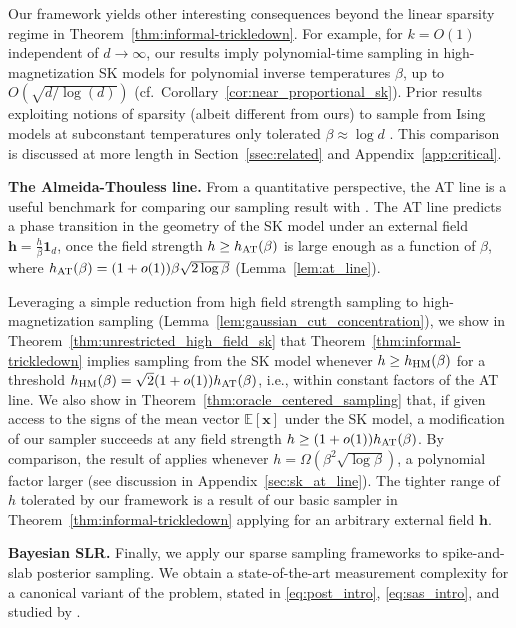 \documentclass[11pt]{article}
\newcommand{\1}{\mathbf{1}}
\newcommand{\0}{\mathbf{0}}
\newcommand{\E}{\mathbb{E}}
\newcommand{\bk}{\color{black}}
\newcommand{\vh}{{\mathbf{h}}}
\newcommand{\vx}{{\mathbf{x}}}
\newcommand{\AT}{_{\rm AT}}
\begin{document}
Our framework yields other interesting consequences beyond the linear sparsity regime in Theorem~\ref{thm:informal-trickledown}. For example, for $k = O(1)$ independent of $d \to \infty$, our results imply polynomial-time sampling in high-magnetization SK models for polynomial inverse temperatures $\beta$, up to $O(\sqrt{d/\log(d)})$ (cf.\ Corollary~\ref{cor:near_proportional_sk}). Prior results exploiting notions of sparsity (albeit different from ours) to sample from Ising models at subconstant temperatures only tolerated $\beta \approx \log d$ \cite{Carlson2022, KuchukovaPappikPerkinsYap2025}. This comparison is discussed at more length in Section~\ref{ssec:related} and Appendix~\ref{app:critical}.

\textbf{The Almeida-Thouless line.} From a quantitative perspective, the AT line is a useful benchmark for comparing our sampling result with \cite{BandeiraElAlaouiRodder26}. The AT line predicts a phase transition in the geometry of the SK model under an external field $\vh = \frac h \beta \1_d$, once the field strength $h \ge h\AT(\beta)$ is large enough as a function of $\beta$, where $h\AT(\beta) = (1 + o(1))\beta\sqrt{2\log\beta}$ (Lemma~\ref{lem:at_line}).

Leveraging a simple reduction from high field strength sampling to high-magnetization sampling (Lemma~\ref{lem:gaussian_cut_concentration}), we show in Theorem~\ref{thm:unrestricted_high_field_sk} that Theorem~\ref{thm:informal-trickledown} implies sampling from the SK model whenever $h \ge h_{\rm{HM}}(\beta)$ for a threshold $h_{\rm{HM}}(\beta) = \sqrt{2}(1 + o(1)) h\AT(\beta)$, i.e., within constant factors of the AT line. We also show in Theorem~\ref{thm:oracle_centered_sampling} that, if given access to the signs of the mean vector $\E[\vx]$ under the SK model, a modification of our sampler succeeds at any field strength $h \ge (1 + o(1)) h\AT(\beta)$. By comparison, the result of \cite{BandeiraElAlaouiRodder26} applies whenever $h = \Omega(\beta^2 \sqrt{\log\beta})$, a polynomial factor larger (see discussion in Appendix~\ref{sec:sk_at_line}). The tighter range of $h$ tolerated by our framework is a result of our basic sampler in Theorem~\ref{thm:informal-trickledown} applying for an arbitrary external field $\vh$.
\bk

\textbf{Bayesian SLR.} 
Finally, we apply our sparse sampling frameworks to spike-and-slab posterior sampling. We obtain a state-of-the-art measurement complexity for a canonical variant of the problem, stated in \eqref{eq:post_intro}, \eqref{eq:sas_intro}, and studied by \cite{KumarSTZ25, MontanariW26}.
\end{document}
